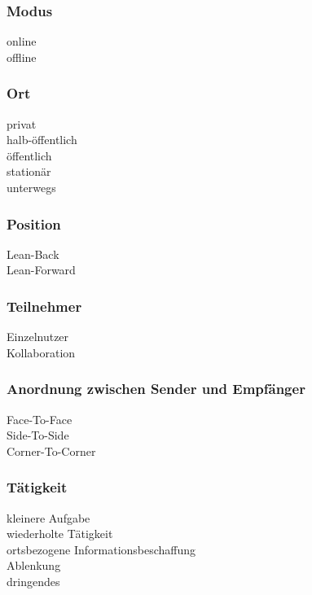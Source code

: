 \subsubsection*{Modus}
\checkbox{\online} online \\
\checkbox{\offline} offline 

\subsubsection*{Ort}
\checkbox{\private} privat \\
\checkbox{\semipublic} halb-öffentlich \\
\checkbox{\public} öffentlich \\
\checkbox{\stationary} stationär \\
\checkbox{\onthego} unterwegs 

\subsubsection*{Position}
\checkbox{\leanback} Lean-Back \\
\checkbox{\leanforward} Lean-Forward 

\subsubsection*{Teilnehmer}
\checkbox{\single} Einzelnutzer \\
\checkbox{\collaboration} Kollaboration

\subsubsection*{Anordnung zwischen Sender und Empfänger}
\checkbox{\facetoface} Face-To-Face \\
\checkbox{\sidetoside} Side-To-Side \\
\checkbox{\cornertocorner} Corner-To-Corner

\subsubsection*{Tätigkeit}
\checkbox{\smalltask} kleinere Aufgabe \\
\checkbox{\repeatedtask} wiederholte Tätigkeit \\
\checkbox{\locationbased} ortsbezogene Informationsbeschaffung \\
\checkbox{\distraction} Ablenkung \\
\checkbox{\urgent} dringendes 

